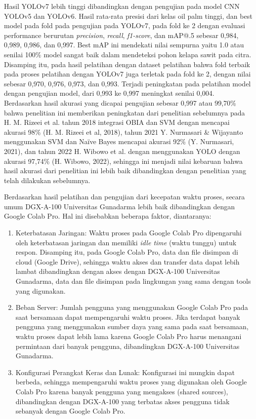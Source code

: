 Hasil YOLOv7 lebih tinggi dibandingkan dengan pengujian pada model CNN YOLOv5 dan YOLOv6. Hasil rata-rata presisi dari kelas oil palm tinggi, dan best model pada fold pada pengujian pada YOLOv7, pada fold ke 2 dengan evaluasi performance berurutan \textit{precision}, \textit{recall}, \textit{f1-score}, dan mAP@.5 sebesar 0,984, 0,989, 0,986, dan 0,997. Best mAP ini mendekati nilai sempurna yaitu 1.0 atau senilai 100\% model sangat baik dalam mendeteksi pohon kelapa sawit pada citra. Disamping itu, pada hasil pelatihan dengan dataset pelatihan bahwa fold terbaik pada proses pelatihan dengan YOLOv7 juga terletak pada fold ke 2, dengan nilai sebesar 0,970, 0,976, 0,973, dan 0,993. Terjadi peningkatan pada pelatihan model dengan pengujian model, dari 0,993 ke 0,997 meningkat senilai 0,004. Berdasarkan hasil akurasi yang dicapai pengujian sebesar 0,997 atau 99,70\% bahwa penelitian ini memberikan peningkatan dari penelitian sebelumnya pada H. M. Rizeei et al. tahun 2018 integrasi OBIA dan SVM dengan mencapai akurasi 98\% (H. M. Rizeei et al, 2018), tahun 2021 Y. Nurmasari \& Wijayanto menggunakan SVM dan Naïve Bayes mencapai akurasi 92\% (Y. Nurmasari, 2021), dan tahun 2022 H. Wibowo et al. dengan menggunakan YOLO dengan akurasi 97,74\% (H. Wibowo, 2022), sehingga ini menjadi nilai kebaruan bahwa hasil akurasi dari penelitian ini lebih baik dibandingkan dengan penelitian yang telah dilakukan sebelumnya.

Berdasarkan hasil pelatihan dan pengujian dari kecepatan waktu proses, secara umum DGX-A-100 Universitas Gunadarma lebih baik dibandingkan dengan Google Colab Pro. Hal ini disebabkan beberapa faktor, diantaranya:

\begin{enumerate}
	\item Keterbatasan Jaringan: Waktu proses pada Google Colab Pro dipengaruhi oleh keterbatasan jaringan dan memiliki \textit{idle time} (waktu tunggu) untuk respon. Disamping itu, pada Google Colab Pro, data dan file disimpan di cloud (Google Drive), sehingga waktu akses dan transfer data dapat lebih lambat dibandingkan dengan akses dengan DGX-A-100 Universitas Gunadarma, data dan file disimpan pada lingkungan yang sama dengan tools yang digunakan. 
	
	\item Beban Server: Jumlah pengguna yang menggunakan Google Colab Pro pada saat bersamaan dapat mempengaruhi waktu proses. Jika terdapat banyak pengguna yang menggunakan sumber daya yang sama pada saat bersamaan, waktu proses dapat lebih lama karena Google Colab Pro harus menangani permintaan dari banyak pengguna, dibandingkan DGX-A-100 Universitas Gunadarma. 
	
	\item Konfigurasi Perangkat Keras dan Lunak: Konfigurasi ini mungkin dapat berbeda, sehingga mempengaruhi waktu proses yang digunakan oleh Google Colab Pro karena banyak pengguna yang mengakses (shared sources), dibandingkan dengan DGX-A-100 yang terbatas akses pengguna tidak sebanyak dengan Google Colab Pro.
	
\end{enumerate}


